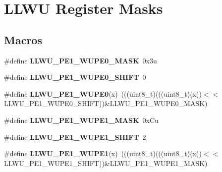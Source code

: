 \hypertarget{group__LLWU__Register__Masks}{}\section{L\+L\+WU Register Masks}
\label{group__LLWU__Register__Masks}
\subsection*{Macros}
\begin{DoxyCompactItemize}
\item 
\#define {\bfseries L\+L\+W\+U\+\_\+\+P\+E1\+\_\+\+W\+U\+P\+E0\+\_\+\+M\+A\+SK}~0x3u\hypertarget{group__LLWU__Register__Masks_ga6ed6c56a8797caa64d27eb915c164dad}{}\label{group__LLWU__Register__Masks_ga6ed6c56a8797caa64d27eb915c164dad}

\item 
\#define {\bfseries L\+L\+W\+U\+\_\+\+P\+E1\+\_\+\+W\+U\+P\+E0\+\_\+\+S\+H\+I\+FT}~0\hypertarget{group__LLWU__Register__Masks_ga234c02ee9c2b3e3e248c90473e922336}{}\label{group__LLWU__Register__Masks_ga234c02ee9c2b3e3e248c90473e922336}

\item 
\#define {\bfseries L\+L\+W\+U\+\_\+\+P\+E1\+\_\+\+W\+U\+P\+E0}(x)~(((uint8\+\_\+t)(((uint8\+\_\+t)(x))$<$$<$L\+L\+W\+U\+\_\+\+P\+E1\+\_\+\+W\+U\+P\+E0\+\_\+\+S\+H\+I\+FT))\&L\+L\+W\+U\+\_\+\+P\+E1\+\_\+\+W\+U\+P\+E0\+\_\+\+M\+A\+SK)\hypertarget{group__LLWU__Register__Masks_ga61f1d3c27404e82bdebb9627e83f35dd}{}\label{group__LLWU__Register__Masks_ga61f1d3c27404e82bdebb9627e83f35dd}

\item 
\#define {\bfseries L\+L\+W\+U\+\_\+\+P\+E1\+\_\+\+W\+U\+P\+E1\+\_\+\+M\+A\+SK}~0x\+Cu\hypertarget{group__LLWU__Register__Masks_gac0c417f78992f2ebaca7267ef06d888a}{}\label{group__LLWU__Register__Masks_gac0c417f78992f2ebaca7267ef06d888a}

\item 
\#define {\bfseries L\+L\+W\+U\+\_\+\+P\+E1\+\_\+\+W\+U\+P\+E1\+\_\+\+S\+H\+I\+FT}~2\hypertarget{group__LLWU__Register__Masks_gaa9b8224f389f9c3d4f13772d8e5fbeee}{}\label{group__LLWU__Register__Masks_gaa9b8224f389f9c3d4f13772d8e5fbeee}

\item 
\#define {\bfseries L\+L\+W\+U\+\_\+\+P\+E1\+\_\+\+W\+U\+P\+E1}(x)~(((uint8\+\_\+t)(((uint8\+\_\+t)(x))$<$$<$L\+L\+W\+U\+\_\+\+P\+E1\+\_\+\+W\+U\+P\+E1\+\_\+\+S\+H\+I\+FT))\&L\+L\+W\+U\+\_\+\+P\+E1\+\_\+\+W\+U\+P\+E1\+\_\+\+M\+A\+SK)\hypertarget{group__LLWU__Register__Masks_gab35a751adac37592806af18a4f6e3837}{}\label{group__LLWU__Register__Masks_gab35a751adac37592806af18a4f6e3837}


\end{DoxyCompactItemize}
